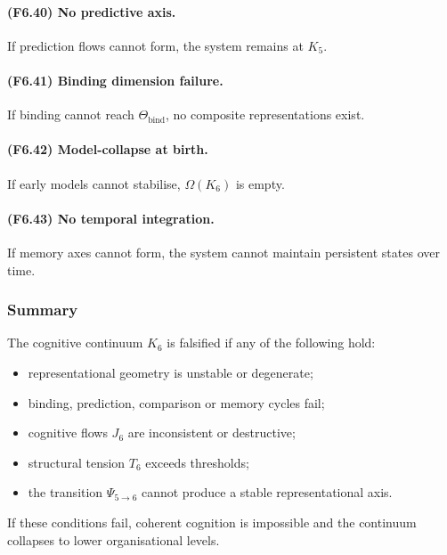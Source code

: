 \paragraph{(F6.40) No predictive axis.}
If prediction flows cannot form,
the system remains at $K_5$.

\paragraph{(F6.41) Binding dimension failure.}
If binding cannot reach $\Theta_{\mathrm{bind}}$,
no composite representations exist.

\paragraph{(F6.42) Model-collapse at birth.}
If early models cannot stabilise,
$\Omega(K_6)$ is empty.

\paragraph{(F6.43) No temporal integration.}
If memory axes cannot form,
the system cannot maintain persistent states over time.



\subsubsection{Summary}

The cognitive continuum $K_6$ is falsified if any of the following hold:

\begin{itemize}
    \item representational geometry is unstable or degenerate;
    \item binding, prediction, comparison or memory cycles fail;
    \item cognitive flows $J_6$ are inconsistent or destructive;
    \item structural tension $T_6$ exceeds thresholds;
    \item the transition $\Psi_{5\to 6}$ cannot produce a stable
          representational axis.
\end{itemize}

If these conditions fail, coherent cognition is impossible and the
continuum collapses to lower organisational levels.
